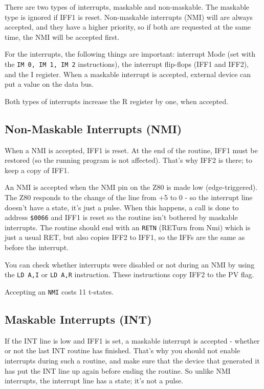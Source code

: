 \documentclass[12pt,twoside,openright,a4paper]{book}
\begin{document}
There are two types of interrupts, maskable and non-maskable. The maskable type is ignored if IFF1 is reset. Non-maskable interrupts (NMI) will are always accepted, and they have a higher priority, so if both are requested at the same time, the NMI will be accepted first.

For the interrupts, the following things are important: interrupt Mode (set with the {\tt IM 0, IM 1, IM 2} instructions), the interrupt flip-flops (IFF1 and IFF2), and the I register. When a maskable interrupt is accepted, external device can put a value on the data bus.

Both types of interrupts increase the R register by one, when accepted.


\subsection{Non-Maskable Interrupts (NMI)}

When a NMI is accepted, IFF1 is reset. At the end of the routine, IFF1 must be restored (so the running program is not affected). That's why IFF2 is there; to keep a copy of IFF1.

An NMI is accepted when the NMI pin on the Z80 is made low (edge-triggered). The Z80 responds to the change of the line from +5 to 0 - so the interrupt line doesn't have a state, it's just a pulse. When this happens, a call is done to address {\tt \$0066} and IFF1 is reset so the routine isn't bothered by maskable interrupts. The routine should end with an {\tt RETN} (RETurn from Nmi) which is just a usual RET, but also copies IFF2 to IFF1, so the IFFs are the same as before the interrupt.

You can check whether interrupts were disabled or not during an NMI by using the {\tt LD A,I} or {\tt LD A,R} instruction. These instructions copy IFF2 to the PV flag.

Accepting an {\tt NMI} costs 11 t-states.


\subsection{Maskable Interrupts (INT)}

If the INT line is low and IFF1 is set, a maskable interrupt is accepted - whether or not the last INT routine has finished. That's why you should not enable interrupts during such a routine, and make sure that the device that generated it has put the INT line up again before ending the routine. So unlike NMI interrupts, the interrupt line has a state; it's not a pulse.
\end{document}
